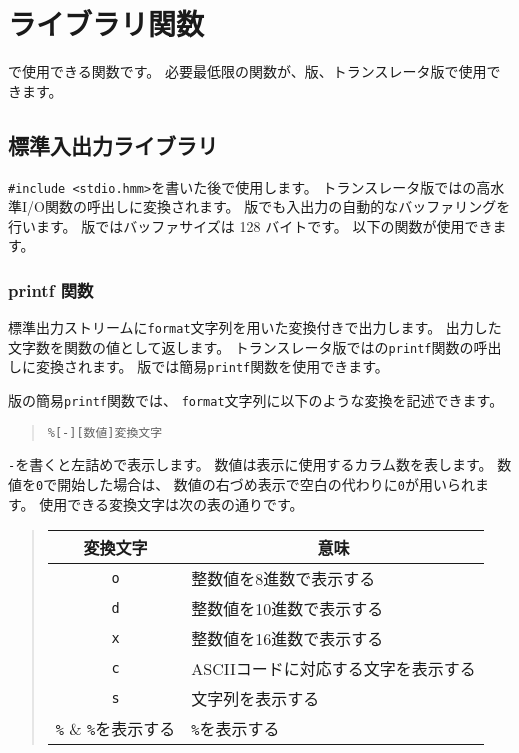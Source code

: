 % 
%
\chapter{ライブラリ関数}

\cmml で使用できる関数です。
必要最低限の関数が、\tac 版、\cl トランスレータ版で使用できます。

\section{標準入出力ライブラリ}

\verb/#include <stdio.hmm>/を書いた後で使用します。
トランスレータ版では\cl の高水準I/O関数の呼出しに変換されます。
\tac 版でも入出力の自動的なバッファリングを行います。
\tac 版ではバッファサイズは 128 バイトです。
以下の関数が使用できます。

\subsection{printf 関数}
標準出力ストリームに\verb/format/文字列を用いた変換付きで出力します。
出力した文字数を関数の値として返します。
トランスレータ版では\cl の\verb/printf/関数の呼出しに変換されます。
\tac 版では簡易\verb/printf/関数を使用できます。

\tac 版の簡易\verb/printf/関数では、
\verb/format/文字列に以下のような変換を記述できます。

\begin{quote}
\begin{verbatim}
%[-][数値]変換文字
\end{verbatim}
\end{quote}

\verb/-/を書くと左詰めで表示します。
数値は表示に使用するカラム数を表します。
数値を\verb/0/で開始した場合は、
数値の右づめ表示で空白の代わりに\verb/0/が用いられます。
使用できる変換文字は次の表の通りです。

\begin{quote}
\begin{tabular}{c|l}
\multicolumn{1}{c|}{変換文字} & \multicolumn{1}{c}{意味} \\\hline
\verb/o/ & 整数値を8進数で表示する \\
\verb/d/ & 整数値を10進数で表示する \\
\verb/x/ & 整数値を16進数で表示する \\
\verb/c/ & ASCIIコードに対応する文字を表示する \\
\verb/s/ & 文字列を表示する \\
\verb/%/ & \verb/%/を表示する \\
\end{tabular}
\end{quote}

